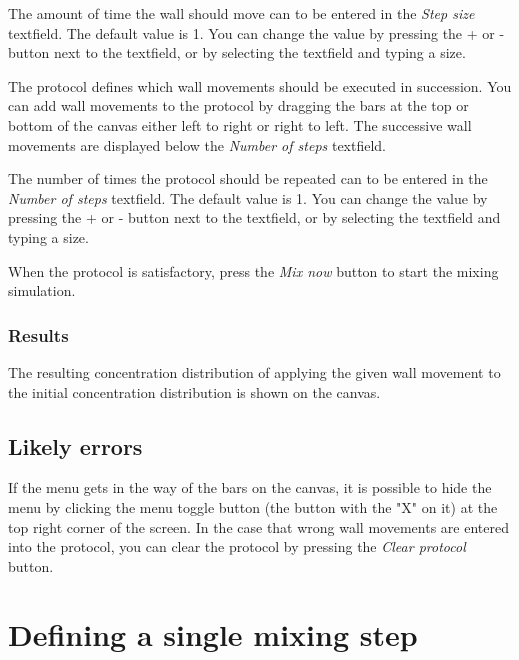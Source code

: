 
The amount of time the wall should move can to be entered in the \emph{Step size} textfield. The default value is 1. You can change the value by pressing the + or - button next to the textfield, or by selecting the textfield and typing a size.

The protocol defines which wall movements should be executed in succession. You can add wall movements to the protocol by dragging the bars at the top or bottom of the canvas either left to right or right to left. The successive wall movements are displayed below the \emph{Number of steps} textfield.

The number of times the protocol should be repeated can to be entered in the \emph{Number of steps} textfield. The default value is 1. You can change the value by pressing the + or - button next to the textfield, or by selecting the textfield and typing a size.

When the protocol is satisfactory, press the \emph{Mix now} button to start the mixing simulation.

\subsubsection{Results}
The resulting concentration distribution of applying the given wall movement to the initial concentration distribution is shown on the canvas.

\subsection{Likely errors}
If the menu gets in the way of the bars on the canvas, it is possible to hide the menu by clicking the menu toggle button (the button with the "X" on it) at the top right corner of the screen. In the case that wrong wall movements are entered into the protocol, you can clear the protocol by pressing the \emph{Clear protocol} button.




\section{Defining a single mixing step}
\label{sec:singleStepMix}

